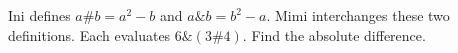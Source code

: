 Ini defines $a\#b=a^2-b$ and $a\&b=b^2-a$. Mimi interchanges these two definitions. Each evaluates $6\&(3\#4)$. Find the absolute difference.
